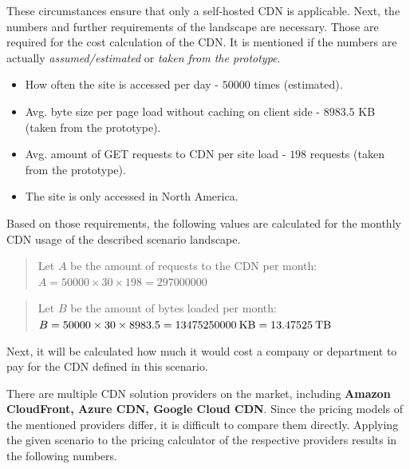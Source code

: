 These circumstances ensure that only a self-hosted CDN is applicable.
Next, the numbers and further requirements of the landscape are necessary. Those are required for the cost calculation of the CDN.
It is mentioned if the numbers are actually \textit{assumed/estimated} or \textit{taken from the prototype}.

\begin{itemize}[noitemsep]
	\item How often the site is accessed per day - $50 000$ times (estimated).
	\item Avg. byte size per page load without caching on client side - $8983.5$ KB (taken from the prototype).
	\item Avg. amount of GET requests to CDN per site load - $198$ requests (taken from the prototype).
	\item The site is only accessed in North America.
\end{itemize} 

Based on those requirements, the following values are calculated for the monthly CDN usage of the described scenario landscape.

\begin{quote}
	\begin{center}
		Let $A$ be the amount of requests to the CDN per month:
		\begin{math}
			A = 50000 \times 30 \times 198 = 297000000
		\end{math}
	\end{center} 
\end{quote}

\begin{quote}
	\begin{center}
		Let $B$ be the amount of bytes loaded per month:
		\begin{math}
			B = 50000 \times 30 \times 8983.5 = 13475250000 \: $KB$ \; = 13.47525 \: $TB$
		\end{math}
	\end{center} 
\end{quote}

Next, it will be calculated how much it would cost a company or department to pay for the CDN defined in this scenario.

There are multiple CDN solution providers on the market, including \textbf{Amazon CloudFront, Azure CDN, Google Cloud CDN}. \cite{top_10_cdn}
Since the pricing models of the mentioned providers differ, it is difficult to compare them directly. Applying the given scenario to the pricing calculator of the respective providers results in the following numbers.

